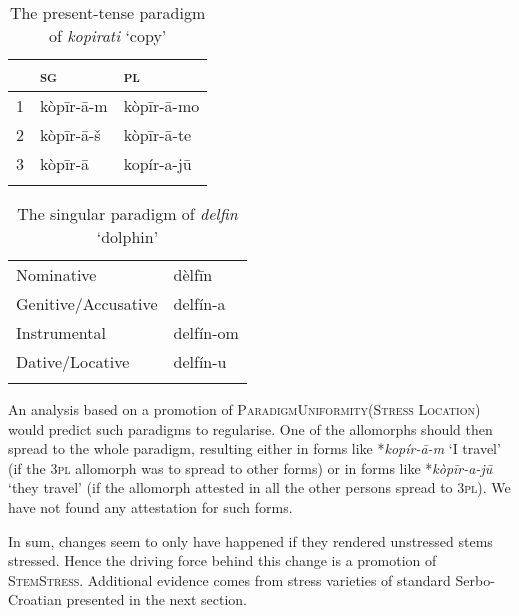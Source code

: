 \documentclass[output=paper,modfonts,nonflat
]{langsci/langscibook}
\begin{document}
\begin{table}
\caption{The present-tense paradigm of \textit{kopirati} `copy'}
\label{tab:kager:8}
\begin{tabular}{ l l l }
  \lsptoprule
& \textsc{sg}  & \textsc{pl}\\ 
 \midrule
 1  &  kòpīr-ā-m  &   kòpīr-ā-mo \\
2  &  kòpīr-ā-š  & kòpīr-ā-te \\
3  &  kòpīr-ā & kopír-a-jū \\
  \lspbottomrule
 \end{tabular}
\end{table}

\begin{table}
\caption{The singular paradigm of \textit{delfin} `dolphin'}
\label{tab:kager:9}
 \begin{tabular}{   l l }
    \lsptoprule
 Nominative  & dèlfīn  \\
Genitive/Accusative  & delfín-a \\
Instrumental   &  delfín-om \\
Dative/Locative   &  delfín-u \\
\lspbottomrule
 \end{tabular}
\end{table}
	
An analysis based on a promotion of \textsc{ParadigmUniformity(Stress Location)} would predict such paradigms to regularise. One of the allomorphs should then spread to the whole paradigm, resulting either in forms like *\textit{kopír-ā-m} `I travel' (if the 3\textsc{pl} allomorph was to spread to other forms) or in forms like *\textit{kòpīr-a-jū} `they travel' (if the allomorph attested in all the other persons spread to 3\textsc{pl}). We have not found any attestation for such forms. 

In sum, changes seem to only have happened if they rendered unstressed stems stressed. Hence the driving force behind this change is a promotion of \textsc{StemStress}. Additional evidence comes from stress varieties of standard Serbo-Croatian presented in the next section.
\end{document}

